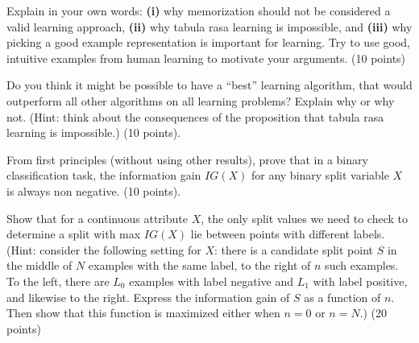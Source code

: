 \documentclass[fleqn]{homework}
\begin{document}
  \maketitle

  \begin{problem}{1}
    \begin{question}
      Explain in your own words: \textbf{(i)} why memorization should not be
      considered a valid learning approach, \textbf{(ii)} why tabula rasa
      learning is impossible, and \textbf{(iii)} why picking a good example
      representation is important for learning.  Try to use good, intuitive
      examples from human learning to motivate your arguments. (10 points)
    \end{question}
  \end{problem}

  \begin{problem}{2}
    \begin{question}
      Do you think it might be possible to have a ``best'' learning algorithm,
      that would outperform all other algorithms on all learning problems?
      Explain why or why not.  (Hint: think about the consequences of the
      proposition that tabula rasa learning is impossible.) (10 points).
    \end{question}
  \end{problem}

  \begin{problem}{3}
    \begin{question}
      From first principles (without using other results), prove that in a
      binary classification task, the information gain $IG(X)$ for any binary
      split variable $X$ is always non negative. (10 points).
    \end{question}
  \end{problem}

  \begin{problem}{4}
    \begin{question}
      Show that for a continuous attribute $X$, the only split values we need to
      check to determine a split with max $IG(X)$ lie between points with
      different labels.  (Hint: consider the following setting for $X$: there is
      a candidate split point $S$ in the middle of $N$ examples with the same
      label, to the right of $n$ such examples.  To the left, there are $L_0$
      examples with label negative and $L_1$ with label positive, and likewise
      to the right.  Express the information gain of $S$ as a function of $n$.
      Then show that this function is maximized either when $n=0$ or $n=N$.) (20
      points)
    \end{question}
  \end{problem}
\end{document}
